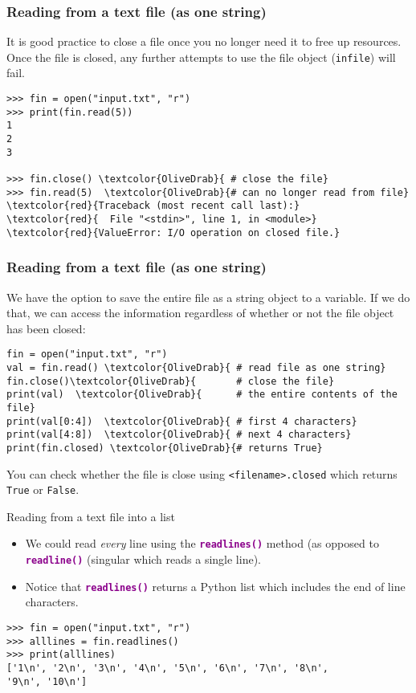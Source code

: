 \documentclass[xcolor=svgnames]{beamer}
\newcommand{\command}[1]{\texttt{\textbf{\textcolor{DarkMagenta}{#1}}}}
\newcommand{\ft}[1]{\frametitle{#1}}
\begin{document}
\begin{frame}[fragile]\ft{Reading from a text file (as one string)}
It is good practice to close a file once you no longer need it to free up resources.  Once the file is closed, any further attempts to use the file object ({\tt infile}) will fail. \vfill
 \begin{Verbatim}[commandchars=\\\{\}, frame=single]
>>> fin = open("input.txt", "r") 
>>> print(fin.read(5))
1
2
3

>>> fin.close() \textcolor{OliveDrab}{ # close the file}
>>> fin.read(5)  \textcolor{OliveDrab}{# can no longer read from file}
\textcolor{red}{Traceback (most recent call last):}
\textcolor{red}{  File "<stdin>", line 1, in <module>}
\textcolor{red}{ValueError: I/O operation on closed file.}
\end{Verbatim}
\vfill
\end{frame}

\begin{frame}[fragile]\ft{Reading from a text file (as one string)}
We have the option to save the entire file as a string object to a variable. If we do that, we can access the information regardless of whether or not the file object has been closed:
\vfill
 \begin{Verbatim}[commandchars=\\\{\}, frame=single]
fin = open("input.txt", "r") 
val = fin.read() \textcolor{OliveDrab}{ # read file as one string}
fin.close()\textcolor{OliveDrab}{       # close the file}
print(val)  \textcolor{OliveDrab}{      # the entire contents of the file}
print(val[0:4])  \textcolor{OliveDrab}{ # first 4 characters}
print(val[4:8])  \textcolor{OliveDrab}{ # next 4 characters}
print(fin.closed) \textcolor{OliveDrab}{# returns True}
\end{Verbatim}
\vfill
\begin{block}{}
You can check whether the file is close using {\tt <filename>.closed} which returns  {\tt True} or {\tt False}.
\end{block}
\vfill
\end{frame}

\begin{frame}[fragile]{Reading from a text file into a list}
\begin{itemize}
\vfill
\item We could read \textit{every} line using the \command{readlines()} method (as opposed to \command{readline()} (singular which reads a single line).
\vfill
\item Notice that \command{readlines()} returns a Python list which includes the end of line characters.
\end{itemize}
\vfill
\begin{Verbatim}[fontsize=\small, frame=single]
>>> fin = open("input.txt", "r")
>>> alllines = fin.readlines()
>>> print(alllines) 
['1\n', '2\n', '3\n', '4\n', '5\n', '6\n', '7\n', '8\n', 
'9\n', '10\n']
\end{Verbatim}
\vfill
\end{frame}
\end{document}

